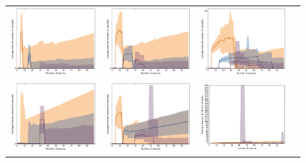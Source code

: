 \documentclass{article}
\renewcommand\[{\begin{equation}}
\renewcommand\]{\end{equation}}
\begin{document}
\begin{figure}[b]
\begin{tabular}{cccc}
        \includegraphics[width=12em]{figures/synthetic_4_uniform_sparse_cv1_time} &
        \includegraphics[width=12em]{figures/synthetic_5_uniform_sparse_cv1_time} &
        \includegraphics[width=12em]{figures/synthetic_6_uniform_sparse_cv1_time}
        \\
        \includegraphics[width=12em]{figures/synthetic_3_normal_cv1_time} &
        \includegraphics[width=12em]{figures/synthetic_4_normal_cv1_time} &
        \includegraphics[width=12em]{figures/synthetic_5_normal_cv1_time} &

\end{tabular}
\end{figure}
\end{document}
